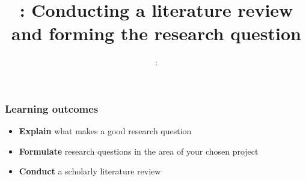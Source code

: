 \usepackage{../../beamerthemeFalmouthGamesAcademy}
\usepackage{multimedia}
\graphicspath{ {../../} }


\usepackage[normalem]{ulem}
\usepackage{wasysym}

\usepackage{algpseudocode}

\usepackage{pdfpages}

\usepackage{fancyvrb}

\usetikzlibrary{arrows,automata}




\title{\sessionnumber: Conducting a literature review and forming the research question}
\subtitle{\modulecode: \moduletitle}

\frame{\titlepage} 

\begin{frame}
	\frametitle{Learning outcomes}
	\begin{itemize}
		\item \textbf{Explain} what makes a good research question
		\item \textbf{Formulate} research questions in the area of your chosen project
		\item \textbf{Conduct} a scholarly literature review
	\end{itemize}
\end{frame}






